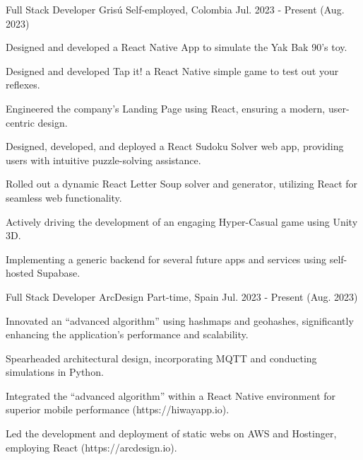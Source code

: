 \newcommand{\quotes}[1]{``#1''}

\begin{cventries}

  \cventry
  {Full Stack Developer} %
  {Grisú} %
  {Self-employed, Colombia} %
  {Jul. 2023 - Present (Aug. 2023)} %
  {
    \begin{cvitems} %
      \item {Designed and developed a React Native App to simulate the Yak Bak 90's toy.}
      \item {Designed and developed Tap it! a React Native simple game to test out your reflexes.}
      \item {Engineered the company's Landing Page using React, ensuring a modern, user-centric design.}
      \item {Designed, developed, and deployed a React Sudoku Solver web app, providing users with intuitive puzzle-solving assistance.}
      \item {Rolled out a dynamic React Letter Soup solver and generator, utilizing React for seamless web functionality.}
      \item {Actively driving the development of an engaging Hyper-Casual game using Unity 3D.}
      \item {Implementing a generic backend for several future apps and services using self-hosted Supabase.}
    \end{cvitems}
  }

  \cventry
  {Full Stack Developer} %
  {ArcDesign} %
  {Part-time, Spain} %
  {Jul. 2023 - Present (Aug. 2023)} %
  {
    \begin{cvitems} %
      \item {Innovated an \quotes{advanced algorithm} using hashmaps and geohashes, significantly enhancing the application's performance and scalability.}
      \item {Spearheaded architectural design, incorporating MQTT and conducting simulations in Python.}
      \item {Integrated the \quotes{advanced algorithm} within a React Native environment for superior mobile performance (https://hiwayapp.io).}
      \item {Led the development and deployment of static webs on AWS and Hostinger, employing React (https://arcdesign.io).}
    \end{cvitems}
  }


\end{cventries}
